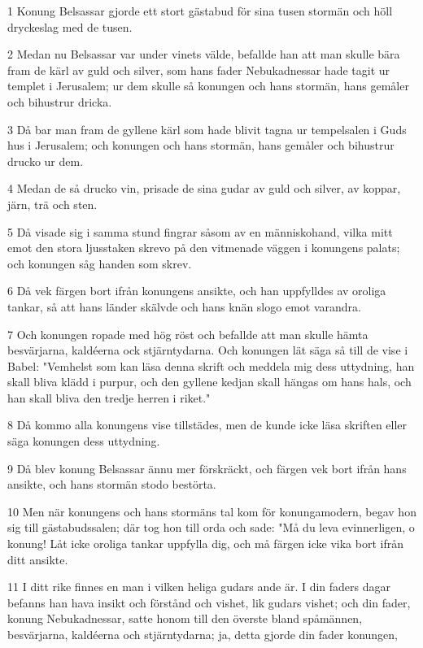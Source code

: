 \par 1 Konung Belsassar gjorde ett stort gästabud för sina tusen stormän och höll dryckeslag med de tusen.
\par 2 Medan nu Belsassar var under vinets välde, befallde han att man skulle bära fram de kärl av guld och silver, som hans fader Nebukadnessar hade tagit ur templet i Jerusalem; ur dem skulle så konungen och hans stormän, hans gemåler och bihustrur dricka.
\par 3 Då bar man fram de gyllene kärl som hade blivit tagna ur tempelsalen i Guds hus i Jerusalem; och konungen och hans stormän, hans gemåler och bihustrur drucko ur dem.
\par 4 Medan de så drucko vin, prisade de sina gudar av guld och silver, av koppar, järn, trä och sten.
\par 5 Då visade sig i samma stund fingrar såsom av en människohand, vilka mitt emot den stora ljusstaken skrevo på den vitmenade väggen i konungens palats; och konungen såg handen som skrev.
\par 6 Då vek färgen bort ifrån konungens ansikte, och han uppfylldes av oroliga tankar, så att hans länder skälvde och hans knän slogo emot varandra.
\par 7 Och konungen ropade med hög röst och befallde att man skulle hämta besvärjarna, kaldéerna ock stjärntydarna. Och konungen lät säga så till de vise i Babel: "Vemhelst som kan läsa denna skrift och meddela mig dess uttydning, han skall bliva klädd i purpur, och den gyllene kedjan skall hängas om hans hals, och han skall bliva den tredje herren i riket."
\par 8 Då kommo alla konungens vise tillstädes, men de kunde icke läsa skriften eller säga konungen dess uttydning.
\par 9 Då blev konung Belsassar ännu mer förskräckt, och färgen vek bort ifrån hans ansikte, och hans stormän stodo bestörta.
\par 10 Men när konungens och hans stormäns tal kom för konungamodern, begav hon sig till gästabudssalen; där tog hon till orda och sade: "Må du leva evinnerligen, o konung! Låt icke oroliga tankar uppfylla dig, och må färgen icke vika bort ifrån ditt ansikte.
\par 11 I ditt rike finnes en man i vilken heliga gudars ande är. I din faders dagar befanns han hava insikt och förstånd och vishet, lik gudars vishet; och din fader, konung Nebukadnessar, satte honom till den överste bland spåmännen, besvärjarna, kaldéerna och stjärntydarna; ja, detta gjorde din fader konungen,
